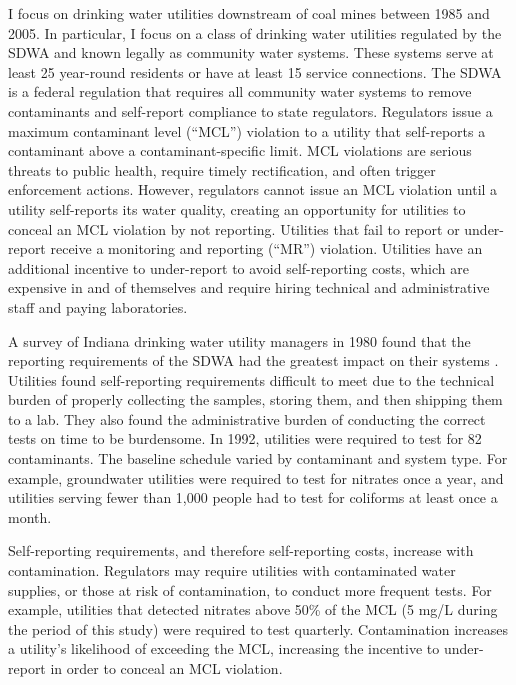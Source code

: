 \documentclass[12pt]{article}
\begin{document}
I focus on drinking water utilities downstream of coal mines between 1985 and 2005. In particular, I focus on a class of drinking water utilities regulated by the SDWA and known legally as community water systems. These systems serve at least 25 year-round residents or have at least 15 service connections. The SDWA is a federal regulation that requires all community water systems to remove contaminants and self-report compliance to state regulators. Regulators issue a maximum contaminant level (``MCL'') violation to a utility that self-reports a contaminant above a contaminant-specific limit. MCL violations are serious threats to public health, require timely rectification, and often trigger enforcement actions. However, regulators cannot issue an MCL violation until a utility self-reports its water quality, creating an opportunity for utilities to conceal an MCL violation by not reporting. Utilities that fail to report or under-report receive a monitoring and reporting (``MR'') violation. Utilities have an additional incentive to under-report to avoid self-reporting costs, which are expensive in and of themselves and require hiring technical and administrative staff and paying laboratories. 

A survey of Indiana drinking water utility managers in 1980 found that the reporting requirements of the SDWA had the greatest impact on their systems \parencite{oleckno1982national}. Utilities found self-reporting requirements difficult to meet due to the technical burden of properly collecting the samples, storing them, and then shipping them to a lab. They also found the administrative burden of conducting the correct tests on time to be burdensome. In 1992, utilities were required to test for 82 contaminants. The baseline schedule varied by contaminant and system type. For example, groundwater utilities were required to test for nitrates once a year, and utilities serving fewer than 1,000 people had to test for coliforms at least once a month. 

Self-reporting requirements, and therefore self-reporting costs, increase with contamination. Regulators may require utilities with contaminated water supplies, or those at risk of contamination, to conduct more frequent tests. For example, utilities that detected nitrates above 50\% of the MCL (5 mg/L during the period of this study) were required to test quarterly. Contamination increases a utility's likelihood of exceeding the MCL, increasing the incentive to under-report in order to conceal an MCL violation.
\end{document}
